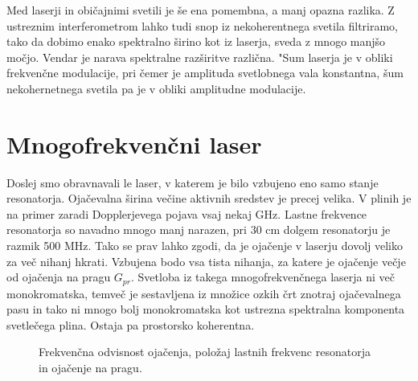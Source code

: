 Med laserji in običajnimi svetili je še ena pomembna, a manj opazna
razlika. Z ustreznim interferometrom lahko tudi snop iz nekoherentnega
svetila filtriramo, tako da dobimo enako spektralno širino kot iz laserja,
sveda z mnogo manjšo močjo. Vendar je narava spektralne razširitve
različna. "Sum laserja je v obliki frekvenčne modulacije, pri čemer je
amplituda svetlobnega vala konstantna, šum nekohernetnega svetila pa je v
obliki amplitudne modulacije.

\section{Mnogofrekvenčni laser}

Doslej smo obravnavali le laser, v katerem je bilo vzbujeno eno samo stanje
resonatorja. Ojačevalna širina večine aktivnih sredstev je precej
velika. V plinih je na primer zaradi Dopplerjevega pojava vsaj nekaj GHz.
Lastne frekvence resonatorja so navadno mnogo manj narazen, pri 30 cm dolgem
resonatorju je razmik 500 MHz. Tako se prav lahko zgodi, da je ojačenje v
laserju dovolj veliko za več nihanj hkrati. Vzbujena bodo vsa tista
nihanja, za katere je ojačenje večje od ojačenja na pragu $G_{pr}$.
Svetloba iz takega mnogofrekvenčnega laserja ni več monokromatska,
temveč je sestavljena iz množice ozkih črt znotraj ojačevalnega pasu
in tako ni mnogo bolj monokromatska kot ustrezna spektralna komponenta
svetlečega plina. Ostaja pa prostorsko koherentna.

\begin{figure}[tbp]
\label{s5.6} \vskip 5cm
\caption{ Frekvenčna odvisnost ojačenja, položaj lastnih frekvenc
resonatorja in ojačenje na pragu.}
\end{figure}


